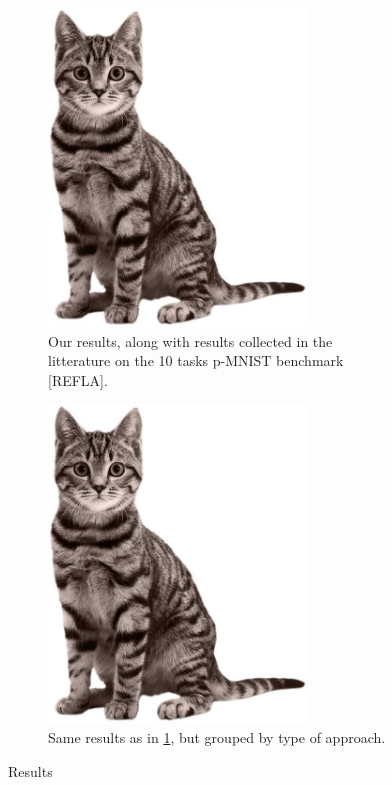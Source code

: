 \documentclass[11pt]{article}
\begin{document}
\begin{figure}
    \centering
    \begin{subfigure}[b]{0.4\textwidth}
        \centering
        \includegraphics[width=0.75\textwidth]{images/cat.jpg}
        \caption{Our results, along with results collected in the litterature on the 10 tasks p-MNIST benchmark [REFLA].}
        \label{fig:results}
    \end{subfigure}
    \hspace{-0mm}
    \begin{subfigure}[b]{0.4\textwidth}
        \centering
        \includegraphics[width=0.75\textwidth]{images/cat.jpg}
        \caption{Same results as in \ref{fig:results}, but grouped by type of approach.}
        \label{fig:results_grouped}
    \end{subfigure}
    \caption{Results}
\end{figure}
\end{document}
